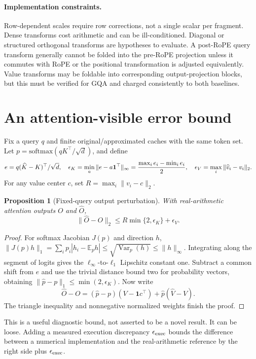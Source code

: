 \documentclass[11pt]{article}
\newtheorem{proposition}{Proposition}
\begin{document}
\paragraph{Implementation constraints.}
Row-dependent scales require row corrections, not a single scalar per fragment.
Dense transforms cost arithmetic and can be ill-conditioned. Diagonal or
structured orthogonal transforms are hypotheses to evaluate. A post-RoPE query
transform generally cannot be folded into the pre-RoPE projection unless it
commutes with RoPE or the positional transformation is adjusted equivalently.
Value transforms may be foldable into corresponding output-projection blocks,
but this must be verified for GQA and charged consistently to both baselines.

\section{An attention-visible error bound}
Fix a query $q$ and finite original/approximated caches with the same token set.
Let $p=\mathrm{softmax}(qK^\top/\sqrt d)$, and define
\[
 e=q(\widehat K-K)^\top/\sqrt d,\quad
 \epsilon_K=\min_a\|e-a\mathbf1^\top\|_\infty
             ={\max_i e_i-\min_i e_i\over2},\quad
 \epsilon_V=\max_i\|\widehat v_i-v_i\|_2.
\]
For any value center $c$, set $R=\max_i\|v_i-c\|_2$.
\begin{proposition}[Fixed-query output perturbation]
With real-arithmetic attention outputs $O$ and $\widehat O$,
\[
 \|\widehat O-O\|_2\le R\min\{2,\epsilon_K\}+\epsilon_V.
\]
\end{proposition}
\begin{proof}
For softmax Jacobian $J(p)$ and direction $h$,
$\|J(p)h\|_1=\sum_i p_i|h_i-\mathbb E_p h|\le
\sqrt{\operatorname{Var}_p(h)}\le\|h\|_\infty$.
Integrating along the segment of logits gives the $\ell_\infty$-to-$\ell_1$
Lipschitz constant one. Subtract a common shift from $e$ and use the trivial
distance bound two for probability vectors, obtaining
$\|\widehat p-p\|_1\le\min(2,\epsilon_K)$.
Now write
\[
 \widehat O-O=(\widehat p-p)(V-\mathbf1c^\top)
                 +\widehat p(\widehat V-V).
\]
The triangle inequality and nonnegative normalized weights finish the proof.
\end{proof}
This is a useful diagnostic bound, not asserted to be a novel result. It can be
loose. Adding a measured execution discrepancy $\epsilon_{\rm exec}$ bounds
the difference between a numerical implementation and the real-arithmetic
reference by the right side plus $\epsilon_{\rm exec}$.
\end{document}
